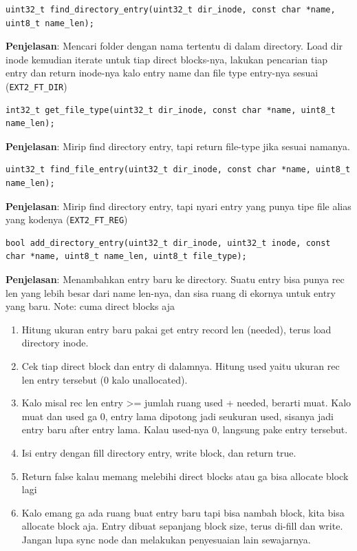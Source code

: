 \begin{lstlisting}
uint32_t find_directory_entry(uint32_t dir_inode, const char *name, uint8_t name_len);
\end{lstlisting}

\textbf{Penjelasan}: Mencari folder dengan nama tertentu di dalam directory. Load dir inode kemudian iterate untuk tiap direct blocks-nya, lakukan pencarian tiap entry dan return inode-nya kalo entry name dan file type entry-nya sesuai (\texttt{EXT2\_FT\_DIR})

\begin{lstlisting}
int32_t get_file_type(uint32_t dir_inode, const char *name, uint8_t name_len);
\end{lstlisting}

\textbf{Penjelasan}: Mirip find directory entry, tapi return file-type jika sesuai namanya.

\begin{lstlisting}
uint32_t find_file_entry(uint32_t dir_inode, const char *name, uint8_t name_len);
\end{lstlisting}

\textbf{Penjelasan}: Mirip find directory entry, tapi nyari entry yang punya tipe file alias yang kodenya (\texttt{EXT2\_FT\_REG})

\begin{lstlisting}
bool add_directory_entry(uint32_t dir_inode, uint32_t inode, const char *name, uint8_t name_len, uint8_t file_type);
\end{lstlisting}

\textbf{Penjelasan}:
Menambahkan entry baru ke directory. Suatu entry bisa punya rec len yang lebih besar dari name len-nya, dan sisa ruang di ekornya untuk entry yang baru. Note: cuma direct blocks aja

\begin{enumerate}
    \item Hitung ukuran entry baru pakai get entry record len (needed), terus load directory inode.
    \item Cek tiap direct block dan entry di dalamnya. Hitung used yaitu ukuran rec len entry tersebut (0 kalo unallocated).
    \item Kalo misal rec len entry >= jumlah ruang used + needed, berarti muat. Kalo muat dan used ga 0, entry lama dipotong jadi seukuran used, sisanya jadi entry baru after entry lama. Kalau used-nya 0, langsung pake entry tersebut.
    \item Isi entry dengan fill directory entry, write block, dan return true.
    \item Return false kalau memang melebihi direct blocks atau ga bisa allocate block lagi
    \item Kalo emang ga ada ruang buat entry baru tapi bisa nambah block, kita bisa allocate block aja. Entry dibuat sepanjang block size, terus di-fill dan write. Jangan lupa sync node dan melakukan penyesuaian lain sewajarnya.
\end{enumerate}

